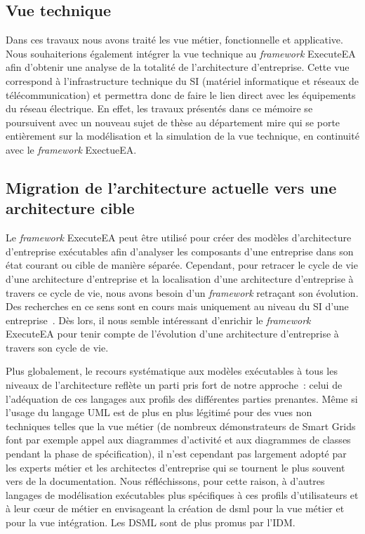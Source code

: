 \subsection{Vue technique}

    Dans ces travaux nous avons traité les vue métier, fonctionnelle et applicative. Nous souhaiterions également
    intégrer la vue technique au \emph{framework} ExecuteEA afin d'obtenir une analyse de la totalité de
    l'architecture d'entreprise. Cette vue correspond à l'infrastructure technique du SI
    (matériel informatique et réseaux de télécommunication) et permettra donc de faire le lien direct avec les équipements
    du réseau électrique. En effet, les travaux présentés dans ce mémoire se poursuivent avec un nouveau sujet de thèse
    au département \gls{mire} qui se porte entièrement sur la modélisation et la simulation de la vue technique, en continuité
    avec le \emph{framework} ExectueEA.

\subsection{Migration de l'architecture actuelle vers une architecture cible}

    Le \emph{framework} ExecuteEA peut être utilisé pour créer des modèles d'architecture d'entreprise exécutables
    afin d'analyser les composants d'une entreprise dans son état courant ou cible de manière séparée. 
    Cependant, pour retracer le cycle de vie d'une architecture d'entreprise et la localisation d'une architecture d'entreprise à
    travers ce cycle de vie, nous avons besoin d'un \emph{framework} retraçant son évolution. Des recherches en ce sens sont en cours
    mais uniquement au niveau du SI d'une entreprise~\cite{metrailler_evolis_2014}. Dès lors, il nous semble intéressant d'enrichir le
    \emph{framework} ExecuteEA pour tenir compte de l'évolution d'une architecture d'entreprise à travers son cycle de vie.

Plus globalement, le recours systématique aux modèles exécutables à tous les
niveaux de l'architecture reflète un parti pris fort de notre approche~: celui de l'adéquation de ces langages aux profils des
différentes parties prenantes. Même si l'usage du langage UML est de plus en plus
légitimé pour des vues non techniques telles que la vue métier (de nombreux démonstrateurs de Smart Grids font par exemple appel aux diagrammes d'activité et aux diagrammes de classes pendant la phase de spécification), il n'est
cependant pas largement adopté par les experts métier et les architectes d'entreprise qui se tournent
le plus souvent vers de la documentation. Nous réfléchissons, pour cette raison, à d'autres
langages de modélisation exécutables plus spécifiques à ces profils d'utilisateurs et à leur cœur de métier
en envisageant la création de \gls{dsml} pour la vue métier et pour la vue intégration. Les DSML sont de plus promus par l'IDM.

